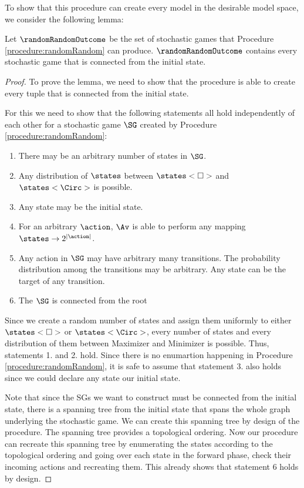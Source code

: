 To show that this procedure can create every model in the desirable model space, we consider the following lemma:
\begin{lemma}
Let $\randomRandomOutcome$ be the set of stochastic games that Procedure \ref{procedure:randomRandom} can produce. $\randomRandomOutcome$ contains every stochastic game that is connected from the initial state.
\end{lemma}
\begin{proof}
To prove the lemma, we need to show that the procedure is able to create every tuple that is connected from the initial state.

For this we need to show that the following statements all hold independently of each other for a stochastic game $\SG$ created by Procedure \ref{procedure:randomRandom}:
\begin{enumerate}
\item There may be an arbitrary number of states in $\SG$.
\item Any distribution of $\states$ between $\states<\Box>$ and $\states<\Circ>$ is possible.
\item Any state may be the initial state.
\item For an arbitrary $\action$, $\Av$ is able to perform any mapping $\states \rightarrow 2^{|\action|}$.
\item Any action in $\SG$ may have arbitrary many transitions. The probability distribution among the transitions may be arbitrary. Any state can be the target of any transition.
\item The $\SG$ is connected from the root
\end{enumerate}


Since we create a random number of states and assign them uniformly to either $\states<\Box>$ or $\states<\Circ>$, every number of states and every distribution of them between Maximizer and Minimizer is possible. Thus, statements 1. and 2. hold. Since there is no enumartion happening in Procedure \ref{procedure:randomRandom}, it is safe to assume that statement 3. also holds since we could declare any state our initial state.

Note that since the SGs we want to construct must be connected from the initial state, there is a spanning tree from the initial state that spans the whole graph underlying the stochastic game.
We can create this spanning tree by design of the procedure. The spanning tree provides a topological ordering. Now our procedure can recreate this spanning tree by enumerating the states according to the
topological ordering and going over each state in the forward phase, check their incoming actions and recreating them. This already shows that statement 6 holds by design.


\end{proof}
